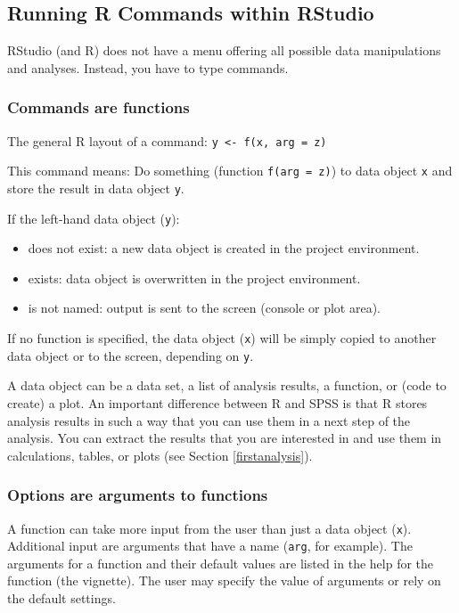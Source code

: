 \documentclass[doc,floatsintext]{apa6}
\providecommand{\tightlist}{%
  \setlength{\itemsep}{0pt}\setlength{\parskip}{0pt}}
\begin{document}
\subsection{Running R Commands within RStudio}\label{rcommands}

RStudio (and R) does not have a menu offering all possible data
manipulations and analyses. Instead, you have to type commands.

\subsubsection{Commands are functions}\label{commands-are-functions}

The general R layout of a command:
\texttt{y\ \textless{}-\ f(x,\ arg\ =\ z)}

This command means: Do something (function \texttt{f(arg\ =\ z)}) to
data object \texttt{x} and store the result in data object \texttt{y}.

If the left-hand data object (\texttt{y}):

\begin{itemize}
\tightlist
\item
  does not exist: a new data object is created in the project
  environment.
\item
  exists: data object is overwritten in the project environment.\\
\item
  is not named: output is sent to the screen (console or plot area).
\end{itemize}

If no function is specified, the data object (\texttt{x}) will be simply
copied to another data object or to the screen, depending on \texttt{y}.

A data object can be a data set, a list of analysis results, a function,
or (code to create) a plot. An important difference between R and SPSS
is that R stores analysis results in such a way that you can use them in
a next step of the analysis. You can extract the results that you are
interested in and use them in calculations, tables, or plots (see
Section \ref{firstanalysis}).

\subsubsection{Options are arguments to
functions}\label{options-are-arguments-to-functions}

A function can take more input from the user than just a data object
(\texttt{x}). Additional input are arguments that have a name
(\texttt{arg}, for example). The arguments for a function and their
default values are listed in the help for the function (the vignette).
The user may specify the value of arguments or rely on the default
settings.
\end{document}
